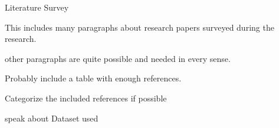 \begin{chapter}{Literature Survey}

\par This includes many paragraphs about research papers surveyed during the research.

\par other paragraphs are quite possible and needed in every sense.

\par Probably include a table with enough references.

\par Categorize the included references if possible

\par speak about Dataset used
    
\end{chapter}